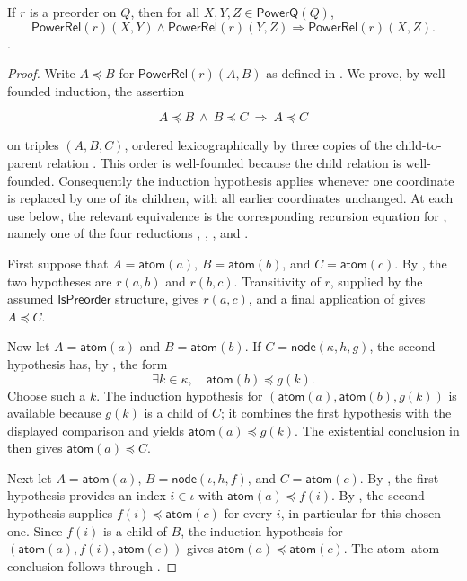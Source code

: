 \begin{lemma}
If $r$ is a preorder on $Q$, then for all
$X,Y,Z\in\mathsf{PowerQ}(Q)$,
\[
\mathsf{PowerRel}(r)(X,Y)\land\mathsf{PowerRel}(r)(Y,Z)
\Longrightarrow\mathsf{PowerRel}(r)(X,Z).
\].
\end{lemma}
\begin{proof}
Write $A\preceq B$ for $\mathsf{PowerRel}(r)(A,B)$ as defined in
.  We prove, by well-founded induction, the assertion

\[
  A\preceq B\ \land\ B\preceq C\ \Longrightarrow\ A\preceq C
\]

on triples $(A,B,C)$, ordered lexicographically by three copies of the
child-to-parent relation .  This order is
well-founded because the child relation is well-founded.  Consequently the
induction hypothesis applies whenever one coordinate is replaced by one of
its children, with all earlier coordinates unchanged.  At each use below,
the relevant equivalence is the corresponding recursion equation for
, namely one of the four reductions
, ,
, and .

First suppose that $A=\mathsf{atom}(a)$, $B=\mathsf{atom}(b)$, and
$C=\mathsf{atom}(c)$.  By , the two hypotheses
are $r(a,b)$ and $r(b,c)$.  Transitivity of $r$, supplied by the assumed
$\mathsf{IsPreorder}$ structure, gives $r(a,c)$, and a final application of
 gives $A\preceq C$.

Now let $A=\mathsf{atom}(a)$ and $B=\mathsf{atom}(b)$.  If
$C=\mathsf{node}(\kappa,h,g)$, the second hypothesis has, by
, the form
\[
  \exists k\in\kappa,\quad \mathsf{atom}(b)\preceq g(k).
\]
Choose such a $k$.  The induction hypothesis for
$(\mathsf{atom}(a),\mathsf{atom}(b),g(k))$ is available because $g(k)$ is
a child of $C$; it combines the first hypothesis with the displayed
comparison and yields $\mathsf{atom}(a)\preceq g(k)$.  The existential
conclusion in  then gives
$\mathsf{atom}(a)\preceq C$.

Next let $A=\mathsf{atom}(a)$, $B=\mathsf{node}(\iota,h,f)$, and
$C=\mathsf{atom}(c)$.  By , the first hypothesis
provides an index $i\in\iota$ with
$\mathsf{atom}(a)\preceq f(i)$.  By , the second
hypothesis supplies $f(i)\preceq\mathsf{atom}(c)$ for every $i$, in
particular for this chosen one.  Since $f(i)$ is a child of $B$, the
induction hypothesis for $(\mathsf{atom}(a),f(i),\mathsf{atom}(c))$ gives
$\mathsf{atom}(a)\preceq\mathsf{atom}(c)$.  The atom--atom conclusion
follows through .


\end{proof}
